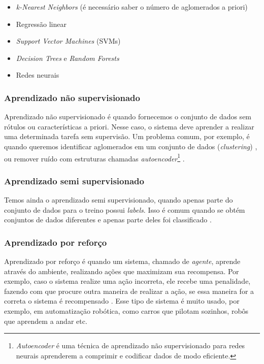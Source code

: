\documentclass[a4paper,12pt,oneside]{book}
\begin{document}
\begin{itemize}
    \item \textit{k-Nearest Neighbors} (é necessário saber o número de aglomerados a priori) \cite{knn}
    \item Regressão linear
    \item \textit{Support Vector Machines} (SVMs)
    \item \textit{Decision Trees} e \textit{Random Forests}
    \item Redes neurais
\end{itemize}

\subsubsection*{Aprendizado não supervisionado}

\par Aprendizado não supervisionado é quando fornecemos o conjunto de dados sem rótulos ou características a priori. Nesse caso, o sistema deve aprender a realizar uma determinada tarefa sem supervisão. Um problema comum, por exemplo, é quando queremos identificar aglomerados em um conjunto de dados (\textit{clustering}) \cite{unsupervised, knn_uns}, ou remover ruído com estruturas chamadas \textit{autoencoder}\footnote[1]{\textit{Autoencoder} é uma técnica de aprendizado não supervisionado para redes neurais aprenderem a comprimir e codificar dados de modo eficiente.} \cite{8621080}.

\subsubsection*{Aprendizado semi supervisionado}

\par Temos ainda o aprendizado semi supervisionado, quando apenas parte do conjunto de dados para o treino possui \textit{labels}. Isso é comum quando se obtém conjuntos de dados diferentes e apenas parte deles foi classificado \cite{semi_supervised}.

\subsubsection*{Aprendizado por reforço}

\par Aprendizado por reforço é quando um sistema, chamado de \textit{agente}, aprende através do ambiente, realizando ações que maximizam sua recompensa. Por exemplo, caso o sistema realize uma ação incorreta, ele recebe uma penalidade, fazendo com que procure outra maneira de realizar a ação, se essa maneira for a correta o sistema é recompensado \cite{reinforcement}. Esse tipo de sistema é muito usado, por exemplo, em automatização robótica, como carros que pilotam sozinhos, robôs que aprendem a andar etc. \cite{robot_ml}
\end{document}
